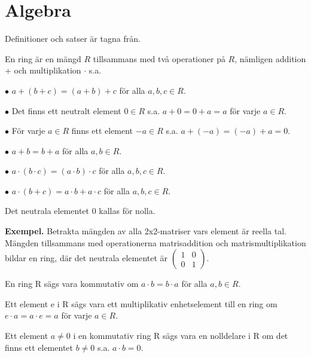 \section{Algebra}
\label{sec:algebra}
Definitioner och satser är tagna från\cite{durbin2008modern}.

\begin{definition}
En ring är en mängd $R$ tillsammans med två operationer på $R$, nämligen addition + och multiplikation $\cdot$ s.a.

$\bullet$ $a+(b+c) = (a+b)+c$ för alla $a,b,c \in R$.

$\bullet$ Det finns ett neutralt element $0 \in R$ s.a. $a+0=0+a=a$ för varje $a \in R$.

$\bullet$ För varje $a \in R$ finns ett element $-a \in R$ s.a. $a + (-a) = (-a) + a = 0$.

$\bullet$ $a + b = b + a$ för alla $a,b \in R$.

$\bullet$ $a \cdot (b \cdot c)=(a \cdot b) \cdot c$ för alla $a,b,c \in R$.

$\bullet$ $a \cdot (b + c) = a \cdot b + a \cdot c$ för alla $a,b,c \in R$.

\noindent
Det neutrala elementet $0$ kallas för nolla.

\end{definition}

\noindent\textbf{Exempel.} Betrakta mängden av alla 2x2-matriser vars element är reella tal. Mängden tillsammans
med operationerna matrisaddition och matrismultiplikation bildar en ring, där det neutrala elementet är $
\begin{pmatrix}
 1 & 0 \\
 0 & 1
\end{pmatrix}.
$

\begin{definition}
 En ring R sägs vara kommutativ om $a \cdot b = b \cdot a$ för alla $a,b \in R$.
\end{definition}

\begin{definition}
 Ett element e i R sägs vara ett multiplikativ enhetselement till en ring om $e \cdot a = a \cdot e = a$ för varje $a \in R$.
\end{definition}

\begin{definition}
 Ett element $a \neq 0$ i en kommutativ ring R sägs vara en nolldelare i R om det finns ett elementet
$b \neq 0$ s.a. $a \cdot b = 0$.
\end{definition}

